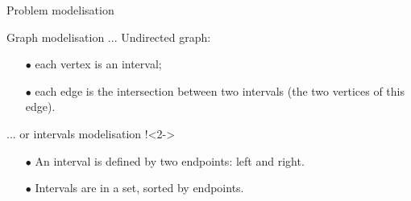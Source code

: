 \documentclass[10pt, compress]{beamer}
\begin{document}
\begin{frame}{Problem modelisation}

\begin{block}{Graph modelisation ...}
Undirected graph:
\begin{itemize}
\item[$\bullet$] each vertex is an interval;
\item[$\bullet$] each edge is the intersection between two intervals (the two vertices of this edge).
\end{itemize}
\end{block}
\pause
\begin{block}{... or intervals modelisation !}<2->
\begin{itemize}
\item[$\bullet$] An interval is defined by two endpoints: left and right.
\item[$\bullet$] Intervals are in a set, sorted by endpoints.
\end{itemize}
\end{block}

\end{frame}
\end{document}
